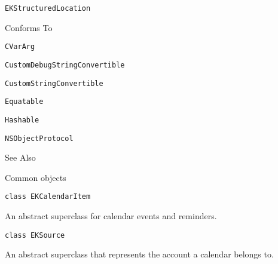 \documentclass{article}
\begin{document}
\texttt{EKStructuredLocation}

Conforms To

\texttt{CVarArg}

\texttt{CustomDebugStringConvertible}

\texttt{CustomStringConvertible}

\texttt{Equatable}

\texttt{Hashable}

\texttt{NSObjectProtocol}

See Also

Common objects

\texttt{class EKCalendarItem}

An abstract superclass for calendar events and reminders.

\texttt{class EKSource}

An abstract superclass that represents the account a calendar belongs to.

\newpage
\end{document}
